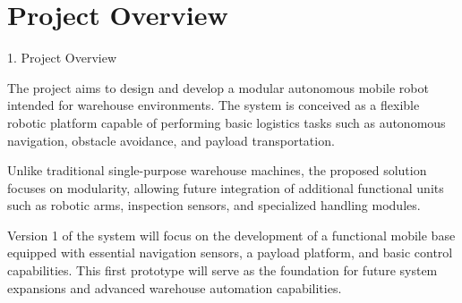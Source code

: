 \chapter{Project Overview}

1. Project Overview

The project aims to design and develop a modular autonomous mobile robot intended for warehouse environments. The system is conceived as a flexible robotic platform capable of performing basic logistics tasks such as autonomous navigation, obstacle avoidance, and payload transportation.

Unlike traditional single-purpose warehouse machines, the proposed solution focuses on modularity, allowing future integration of additional functional units such as robotic arms, inspection sensors, and specialized handling modules.

Version 1 of the system will focus on the development of a functional mobile base equipped with essential navigation sensors, a payload platform, and basic control capabilities. This first prototype will serve as the foundation for future system expansions and advanced warehouse automation capabilities.

